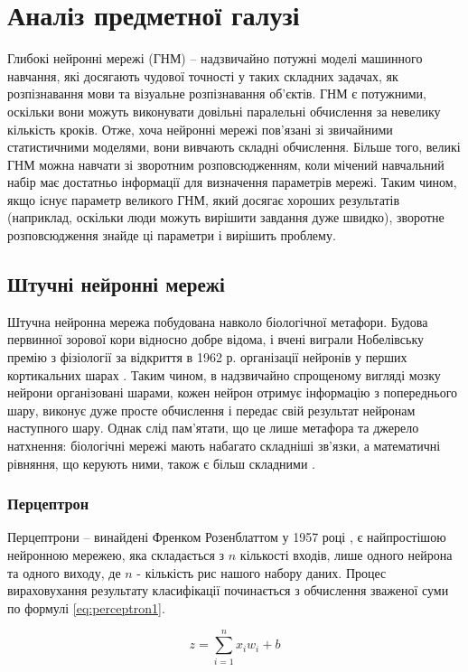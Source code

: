 \chapter{Аналіз предметної галузі}
Глибокі нейронні мережі (ГНМ) -- надзвичайно потужні моделі машинного навчання,
які досягають чудової точності у таких складних задачах, як
розпізнавання мови та візуальне розпізнавання об’єктів.
ГНМ є потужними, оскільки вони можуть виконувати
довільні паралельні обчислення за невелику кількість кроків.
Отже, хоча нейронні мережі пов’язані
зі звичайними статистичними моделями, вони вивчають складні
обчислення. Більше того, великі ГНМ можна навчати зі
зворотним розповсюдженням, коли мічений навчальний набір має
достатньо інформації для визначення параметрів мережі. Таким
чином, якщо існує параметр великого ГНМ, який досягає хороших
результатів (наприклад, оскільки люди можуть вирішити завдання
дуже швидко), зворотне розповсюдження знайде ці
параметри і вирішить проблему.

\section{Штучні нейронні мережі}
Штучна нейронна мережа побудована навколо біологічної метафори.
Будова первинної зорової кори відносно добре відома,
і вчені виграли Нобелівську премію з фізіології за відкриття в
1962 р. організації нейронів у перших кортикальних
шарах \cite{cortex-stuff}. Таким чином, в надзвичайно
спрощеному вигляді
мозку нейрони організовані шарами, кожен нейрон отримує
інформацію з попереднього шару, виконує дуже просте
обчислення і передає свій результат нейронам наступного
шару. Однак слід пам’ятати, що це лише метафора та джерело
натхнення: біологічні мережі мають набагато складніші
зв’язки, а математичні рівняння, що керують ними, також
є більш складними \cite{cortex-equations}.

\subsection{Перцептрон}
Перцептрони -- винайдені Френком Розенблаттом у 1957 році
\cite{rozenblatt}, є найпростішою
нейронною мережею, яка складається з $n$ кількості входів, лише одного
нейрона та одного виходу, де $n$ - кількість рис нашого набору
даних. Процес вираховухання результату класифікації починається
з обчислення зваженої суми
по формулі \ref{eq:perceptron1}.

\begin{equation}
    z = \sum^n_{i=1} x_i w_i + b
    \label{eq:perceptron1}
\end{equation}

